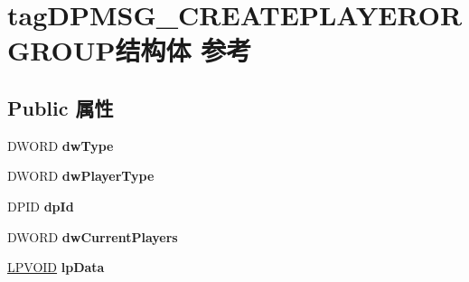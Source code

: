 \hypertarget{structtag_d_p_m_s_g___c_r_e_a_t_e_p_l_a_y_e_r_o_r_g_r_o_u_p}{}\section{tag\+D\+P\+M\+S\+G\+\_\+\+C\+R\+E\+A\+T\+E\+P\+L\+A\+Y\+E\+R\+O\+R\+G\+R\+O\+U\+P结构体 参考}
\label{structtag_d_p_m_s_g___c_r_e_a_t_e_p_l_a_y_e_r_o_r_g_r_o_u_p}
\subsection*{Public 属性}
\begin{DoxyCompactItemize}
\item 
\mbox{\label{structtag_d_p_m_s_g___c_r_e_a_t_e_p_l_a_y_e_r_o_r_g_r_o_u_p_a105d7422ffd7c79496512b253138aee6}} 
D\+W\+O\+RD {\bfseries dw\+Type}
\item 
\mbox{\label{structtag_d_p_m_s_g___c_r_e_a_t_e_p_l_a_y_e_r_o_r_g_r_o_u_p_a0f6e605bdb8cbc2f54775df412be1a37}} 
D\+W\+O\+RD {\bfseries dw\+Player\+Type}
\item 
\mbox{\label{structtag_d_p_m_s_g___c_r_e_a_t_e_p_l_a_y_e_r_o_r_g_r_o_u_p_a42bba60b27f992e3aa499fc3e1cf1b7d}} 
D\+P\+ID {\bfseries dp\+Id}
\item 
\mbox{\label{structtag_d_p_m_s_g___c_r_e_a_t_e_p_l_a_y_e_r_o_r_g_r_o_u_p_a085797306aa6774ca64567c8b0ff8a78}} 
D\+W\+O\+RD {\bfseries dw\+Current\+Players}
\item 
\mbox{\label{structtag_d_p_m_s_g___c_r_e_a_t_e_p_l_a_y_e_r_o_r_g_r_o_u_p_adbb8c047682acf02a8f448d8a19c873d}} 
\hyperlink{interfacevoid}{L\+P\+V\+O\+ID} {\bfseries lp\+Data}
\item 
\mbox{\label{structtag_d_p_m_s_g___c_r_e_a_t_e_p_l_a_y_e_r_o_r_g_r_o_u_p_a987d1237155794b8a108cd34d85456ae}} 

\end{DoxyCompactItemize}
